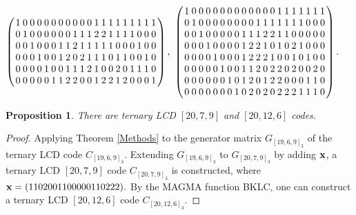 \documentclass[12pt,twoside]{article}
\theoremstyle{plain}
\newtheorem{prop}[theorem]{Proposition}
\theoremstyle{definition}
\theoremstyle{remark}
\begin{document}
\begin{center}
{\small$
\begin{pmatrix}
\setlength{\arraycolsep}{1.2pt}
\begin{array}{cccccccccccccccccccc}
1&0&0&0&0&0&0&0&0&0&0&1&1&1&1&1&1&1&1&1\\
0&1&0&0&0&0&0&0&1&1&1&2&2&1&1&1&1&0&0&0\\
0&0&1&0&0&0&1&1&2&1&1&1&1&1&0&0&0&1&0&0\\
0&0&0&1&0&0&1&2&0&2&1&1&1&0&1&1&0&0&1&0\\
0&0&0&0&1&0&0&1&1&1&2&1&0&0&2&0&1&1&1&0\\
0&0&0&0&0&1&1&2&2&0&0&1&2&2&1&2&0&0&0&1
\end{array}
\end{pmatrix},\
\begin{pmatrix}
\setlength{\arraycolsep}{1.2pt}
\begin{array}{cccccccccccccccccccc}
1&0&0&0&0&0&0&0&0&0&0&0&0&1&1&1&1&1&1&1\\
0&1&0&0&0&0&0&0&0&0&1&1&1&1&1&1&1&0&0&0\\
0&0&1&0&0&0&0&0&1&1&1&2&2&1&1&0&0&0&0&0\\
0&0&0&1&0&0&0&0&1&2&2&1&0&1&0&2&1&0&0&0\\
0&0&0&0&1&0&0&0&1&2&2&2&1&0&0&1&0&1&0&0\\
0&0&0&0&0&1&0&0&1&1&2&0&2&2&0&2&0&0&2&0\\
0&0&0&0&0&0&1&0&1&2&0&1&2&2&0&0&0&1&1&0\\
0&0&0&0&0&0&0&1&0&2&0&2&0&2&2&2&1&1&1&0
\end{array}
\end{pmatrix}.
$
}
\end{center}








\begin{prop}
There are ternary LCD $[20,7,9]$ and $[20,12,6]$ codes.
\end{prop}

\begin{proof}
Applying Theorem \ref{Methods} to the generator matrix $G_{[19,6,9]_3}$ of the ternary LCD code $C_{[19,6,9]_3}$. Extending $G_{[19,6,9]_3}$ to $G_{[20,7,9]_3}$ by adding ${\bf x}$, a ternary LCD $[20,7,9]$ code $C_{[20,7,9]_3}$ is constructed, where ${\bf x}=(1 1 0 2 0 0 1 1 0 0 0 0 0 1 1 0 2 2 2).$
By the MAGMA function BKLC, one can construct a ternary LCD $[20,12,6]$ code $C_{[20,12,6]_3}$.
\end{proof}
\end{document}
